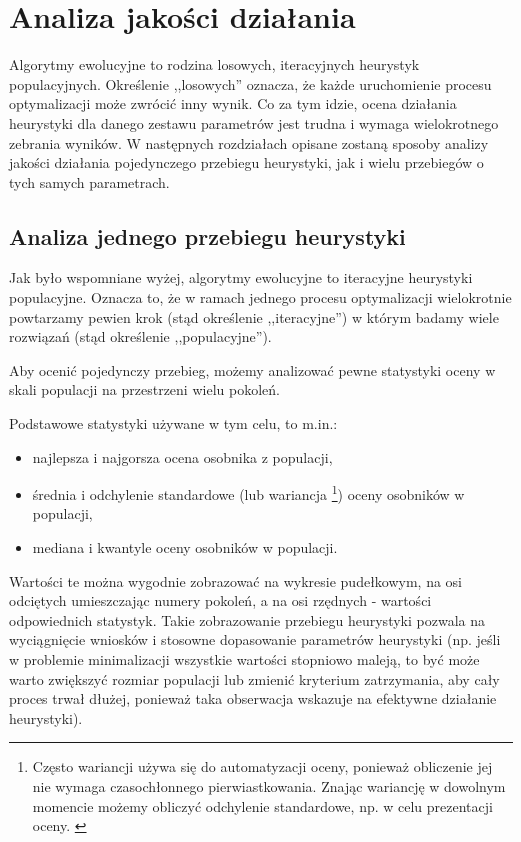 \documentclass[twoside]{iisthesis}
\begin{document}
\section{Analiza jakości działania}

Algorytmy ewolucyjne to rodzina losowych, iteracyjnych heurystyk populacyjnych. Określenie ,,losowych'' oznacza, że każde uruchomienie procesu optymalizacji może zwrócić inny wynik. Co za tym idzie, ocena działania heurystyki dla danego zestawu parametrów jest trudna i wymaga wielokrotnego zebrania wyników. W następnych rozdziałach opisane zostaną sposoby analizy jakości działania pojedynczego przebiegu heurystyki, jak i wielu przebiegów o tych samych parametrach.

\subsection{Analiza jednego przebiegu heurystyki}

Jak było wspomniane wyżej, algorytmy ewolucyjne to iteracyjne heurystyki populacyjne. Oznacza to, że w ramach jednego procesu optymalizacji wielokrotnie powtarzamy pewien krok (stąd określenie ,,iteracyjne'') w którym badamy wiele rozwiązań (stąd określenie ,,populacyjne'').

Aby ocenić pojedynczy przebieg, możemy analizować pewne statystyki oceny w skali populacji na przestrzeni wielu pokoleń.

Podstawowe statystyki używane w tym celu, to m.in.:
\begin{itemize}
	\item najlepsza i najgorsza ocena osobnika z populacji,
	\item średnia i odchylenie standardowe (lub wariancja \footnote{Często wariancji używa się do automatyzacji oceny, ponieważ obliczenie jej nie wymaga czasochłonnego pierwiastkowania. Znając wariancję w dowolnym momencie możemy obliczyć odchylenie standardowe, np. w celu prezentacji oceny.  \label{footer:variance}}) oceny osobników w populacji,
	\item mediana i kwantyle oceny osobników w populacji.
\end{itemize}

Wartości te można wygodnie zobrazować na wykresie pudełkowym, na osi odciętych umieszczając numery pokoleń, a na osi rzędnych - wartości odpowiednich statystyk. Takie zobrazowanie przebiegu heurystyki pozwala na wyciągnięcie wniosków i stosowne dopasowanie parametrów heurystyki (np. jeśli w problemie minimalizacji wszystkie wartości stopniowo maleją, to być może warto zwiększyć rozmiar populacji lub zmienić kryterium zatrzymania, aby cały proces trwał dłużej, ponieważ taka obserwacja wskazuje na efektywne działanie heurystyki).
\end{document}
